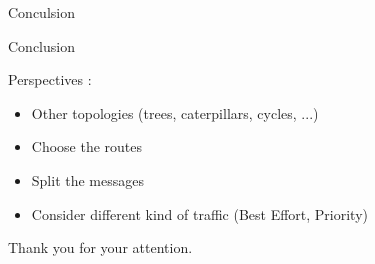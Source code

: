 \documentclass[10 pt]{beamer}
\begin{document}
\begin{section}{Conculsion}
\begin{frame}{Conclusion}


Perspectives :
\begin{itemize}
\item  Other topologies (trees, caterpillars, cycles, ...)
\item Choose the routes
\item Split the messages
\item Consider different kind of traffic (Best Effort, Priority)
\end{itemize}
\vspace{0.5cm}



\end{frame}

\begin{frame}
Thank you for your attention.

\end{frame}
\end{section}
\end{document}
